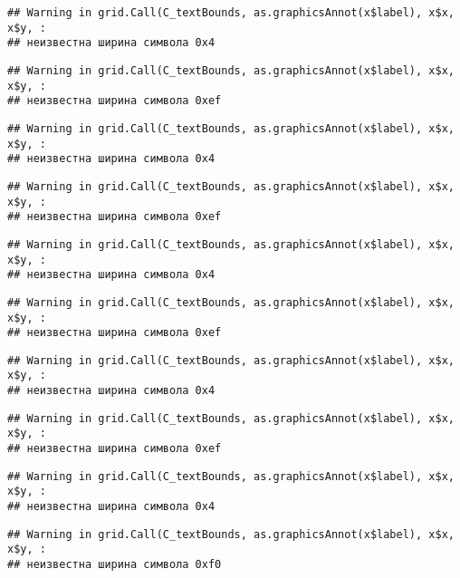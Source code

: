 \documentclass[
]{article}
\begin{document}
\begin{verbatim}
## Warning in grid.Call(C_textBounds, as.graphicsAnnot(x$label), x$x, x$y, :
## неизвестна ширина символа 0x4
\end{verbatim}

\begin{verbatim}
## Warning in grid.Call(C_textBounds, as.graphicsAnnot(x$label), x$x, x$y, :
## неизвестна ширина символа 0xef
\end{verbatim}

\begin{verbatim}
## Warning in grid.Call(C_textBounds, as.graphicsAnnot(x$label), x$x, x$y, :
## неизвестна ширина символа 0x4
\end{verbatim}

\begin{verbatim}
## Warning in grid.Call(C_textBounds, as.graphicsAnnot(x$label), x$x, x$y, :
## неизвестна ширина символа 0xef
\end{verbatim}

\begin{verbatim}
## Warning in grid.Call(C_textBounds, as.graphicsAnnot(x$label), x$x, x$y, :
## неизвестна ширина символа 0x4
\end{verbatim}

\begin{verbatim}
## Warning in grid.Call(C_textBounds, as.graphicsAnnot(x$label), x$x, x$y, :
## неизвестна ширина символа 0xef
\end{verbatim}

\begin{verbatim}
## Warning in grid.Call(C_textBounds, as.graphicsAnnot(x$label), x$x, x$y, :
## неизвестна ширина символа 0x4
\end{verbatim}

\begin{verbatim}
## Warning in grid.Call(C_textBounds, as.graphicsAnnot(x$label), x$x, x$y, :
## неизвестна ширина символа 0xef
\end{verbatim}

\begin{verbatim}
## Warning in grid.Call(C_textBounds, as.graphicsAnnot(x$label), x$x, x$y, :
## неизвестна ширина символа 0x4
\end{verbatim}

\begin{verbatim}
## Warning in grid.Call(C_textBounds, as.graphicsAnnot(x$label), x$x, x$y, :
## неизвестна ширина символа 0xf0
\end{verbatim}
\end{document}
